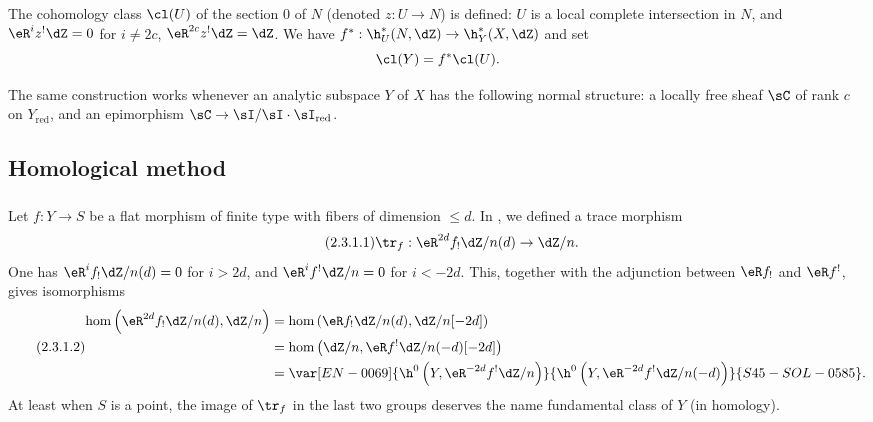 The cohomology class $\cl(U)$ of the section $0$ of $N$ (denoted
$z:U\to N$) is defined: $U$ is a local complete intersection in $N$, and
$\eR^i z^!\dZ = 0$ for $i\ne 2 c$, $\eR^{2 c} z^!\dZ = \dZ$. We have
$f^*:\h_U^*(N,\dZ) \to \h_Y^*(X,\dZ)$ and set
\[
  \cl(Y) = f^*\cl(U) \text{.}
\]

The same construction works whenever an analytic subspace $Y$ of $X$ has
the following normal structure: a locally free sheaf $\sC$ of rank $c$ on
$Y_\text{red}$, and an epimorphism
$\sC\to \sI/\sI\cdot \sI_\text{red}$.










\subsection{Homological method}\label{IV:2-3}






\subsubsection{}\label{IV:2-3-1}

Let $f:Y\to S$ be a flat morphism of finite type with fibers of dimension
$\leqslant d$. In , we defined a trace morphism
\begin{equation*}\tag{2.3.1.1}\label{IV:eq:2-3-1-1}
  \tr_f:\eR^{2 d} f_! \dZ/n(d) \to \dZ/n \text{.}
\end{equation*}
One has $\eR^i f_!\dZ/n(d)=0$ for $i>2 d$, and
$\eR^i f^!\dZ/n=0$ for $i<-2 d$. This, together with the adjunction between
$\eR f_!$ and $\eR f^!$, gives isomorphisms
\begin{equation*}\tag{2.3.1.2}\label{IV:eq:2-3-1-2}
\begin{aligned}
  \hom\left(\eR^{2 d}f_!\dZ/n(d),\dZ/n\right)
    &= \hom\left(\eR f_!\dZ/n(d),\dZ/n[-2 d]\right) \\
    &= \hom\left(\dZ/n,\eR f^!\dZ/n(-d)[-2 d]\right) \\
    &= \var[EN-0069]{\h^0\left(Y,\eR^{-2 d}f^!\dZ/n\right)}{\h^0\left(Y,\eR^{-2 d}f^!\dZ/n(-d)\right)}{S45-SOL-0585} \text{.}
\end{aligned}
\end{equation*}
At least when $S$ is a point, the image of $\tr_f$ in the last two groups
deserves the name fundamental class of $Y$ (in homology).

